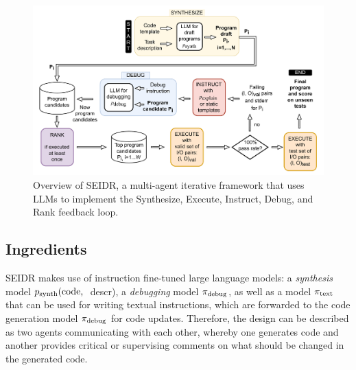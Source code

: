 \begin{figure}
    \centering
    \includegraphics[width=\linewidth,trim={0mm 0mm 0mm 0mm}]{images/codex-for-psb-seidr-methodology-5.drawio.pdf}
    \caption{Overview of SEIDR, a multi-agent iterative framework that uses LLMs to implement the Synthesize, Execute, Instruct, Debug, and Rank feedback loop.}
    \label{fig:method}
\end{figure}
 

\newpage\subsection{Ingredients}
\label{sec:seidr-ingredients}

SEIDR makes use of instruction fine-tuned large language models: a \emph{synthesis} model $p_{\text{synth}}(\text{code, }$ descr), a \emph{debugging} model $ \pi_\text{debug} $, as well as a model $ \pi_\text{text} $ that can be used for writing textual instructions, which are forwarded to the code generation model $ \pi_\text{debug} $ for code updates. 
Therefore, the design can be described as two agents communicating with each other, whereby one generates code and another provides critical or supervising comments on what should be changed in the generated code. 

